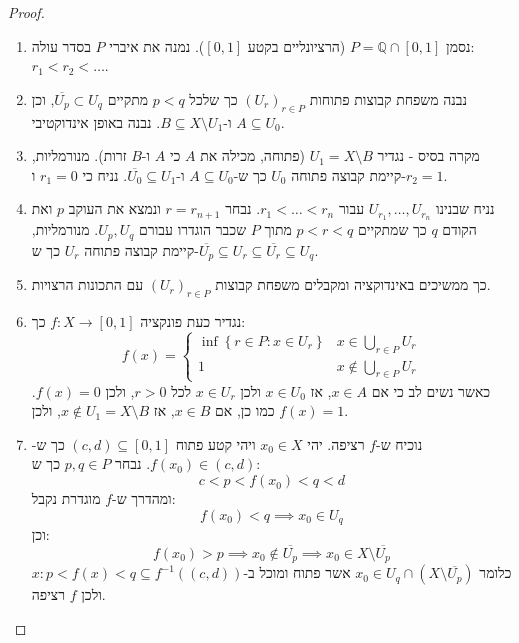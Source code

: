\documentclass{tstextbook}
\begin{document}
\begin{proof}
  \begin{enumerate}
    \item נסמן \(P = \mathbb{Q} \cap [0,1]\) (הרציונליים בקטע \([0,1]\)). נמנה את איברי \(P\) בסדר עולה: \(r_1 < r_2 < \dots\). 


    \item נבנה משפחת קבוצות פתוחות \((U_r)_{r \in P}\) כך שלכל \(p < q\) מתקיים \(\overline{U_p} \subset U_q\), וכן \(A \subseteq U_0\) ו-\(B \subseteq X \setminus U_1\). נבנה באופן אינדוקטיבי. 


    \item מקרה בסיס - נגדיר \(U_1 = X \setminus B\) (פתוחה, מכילה את \(A\) כי \(A\) ו-\(B\) זרות). מנורמליות, קיימת קבוצה פתוחה \(U_0\) כך ש-\(A \subseteq U_0\) ו-\(\overline{U_0} \subseteq U_1\). נניח כי \(r_{1}=0\) ו-\(r_{2}=1\). 


    \item נניח שבנינו \(U_{r_1}, \dots, U_{r_n}\) עבור \(r_1 < \dots < r_n\). נבחר \(r = r_{n+1}\) ונמצא את העוקב \(p\) ואת הקודם \(q\) כך שמתקיים  \(p < r < q\) מתוך \(P\) שכבר הוגדרו עבורם \(U_p, U_q\). מנורמליות, קיימת קבוצה פתוחה \(U_r\) כך ש-\(\overline{U_p} \subseteq U_r \subseteq \overline{U_r} \subseteq U_q\). 


    \item כך ממשיכים באינדוקציה ומקבלים משפחת קבוצות \((U_r)_{r \in P}\) עם התכונות הרצויות. 


    \item נגדיר כעת פונקציה \(f : X \to [0,1]\) כך: 
$$f(x) =\begin{cases}\inf \left\{  r \in P : x \in U_r  \right\} & x \in \bigcup_{r \in P}U_{r} \\1 & x \not  \in \bigcup_{r \in P}U_{r}
\end{cases}$$
כאשר נשים לב כי אם \(x \in A\), אז \(x \in U_0\) ולכן \(x \in U_r\) לכל \(r > 0\), ולכן \(f(x) = 0\). כמו כן, אם \(x \in B\), אז \(x \notin U_1 = X \setminus B\), ולכן \(f(x) = 1\).


    \item נוכיח ש-\(f\) רציפה. יהי \(x_0 \in X\) ויהי קטע פתוח \((c, d) \subseteq [0,1]\) כך ש-\(f(x_0) \in (c, d)\). נבחר \(p, q \in P\) כך ש: 
$$c<p<f(x_{0})<q<d$$
ומהדרך ש-\(f\) מוגדרת נקבל:
$$f(x_0) < q \implies x_0 \in U_q$$
וכן:
$$f(x_0) > p \implies x_0 \notin \overline{U_p} \implies x_0 \in X \setminus \overline{U_p}$$
כלומר \(x_{0}\in U_{q}\cap\left(X\setminus{\overline{{U_{p}}}}\right)\) אשר פתוח ומוכל ב-\({x : p < f(x) < q} \subseteq f^{-1}((c,d))\) ולכן \(f\) רציפה.


  \end{enumerate}
\end{proof}
\end{document}
